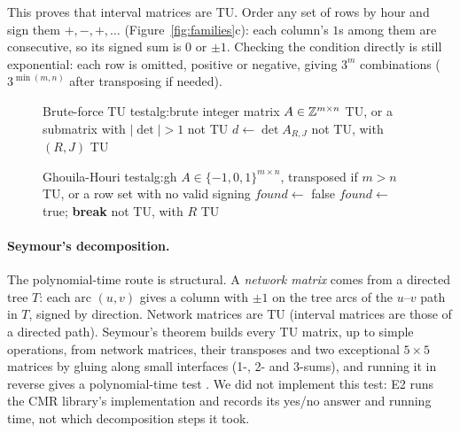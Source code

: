 This proves that interval matrices are TU. Order any set of rows by hour and sign them $+,-,+,\dots$ (Figure~\ref{fig:families}c): each column's $1$s among them are consecutive, so its signed sum is $0$ or $\pm1$. Checking the condition directly is still exponential: each row is omitted, positive or negative, giving $3^m$ combinations ($3^{\min(m,n)}$ after transposing if needed).

\begin{figure}[H]
  \begin{minipage}[t]{0.485\textwidth}
    \begin{algobox}{Brute-force TU test}{alg:brute}
      \Require integer matrix $A\in\mathbb{Z}^{m\times n}$
      \Ensure TU, or a submatrix with $|\det|>1$
        \State \Return not TU
      \EndIf
            \State $d\gets\det A_{R,J}$ 
              \State \Return not TU, with $(R,J)$
            \EndIf
          \EndFor
        \EndFor
      \EndFor
      \State \Return TU
    \end{algobox}
  \end{minipage}\hfill
  \begin{minipage}[t]{0.485\textwidth}
    \begin{algobox}{Ghouila-Houri test}{alg:gh}
      \Require $A\in\{-1,0,1\}^{m\times n}$, transposed if $m>n$
      \Ensure TU, or a row set with no valid signing
        \State $\mathit{found}\gets$ false
            \State $\mathit{found}\gets$ true; \textbf{break}
          \EndIf
        \EndFor
          \State \Return not TU, with $R$
        \EndIf
      \EndFor
      \State \Return TU
    \end{algobox}
  \end{minipage}
\end{figure}

\paragraph{Seymour's decomposition.} The polynomial-time route is structural. A \emph{network matrix} comes from a directed tree $T$: each arc $(u,v)$ gives a column with $\pm1$ on the tree arcs of the $u$--$v$ path in $T$, signed by direction. Network matrices are TU (interval matrices are those of a directed path). Seymour's theorem \cite{seymour1980} builds every TU matrix, up to simple operations, from network matrices, their transposes and two exceptional $5\times5$ matrices by gluing along small interfaces (1-, 2- and 3-sums), and running it in reverse gives a polynomial-time test \cite{truemper1990}. We did not implement this test: E2 runs the CMR library's implementation \cite{walter2013,cmr} and records its yes/no answer and running time, not which decomposition steps it took.

